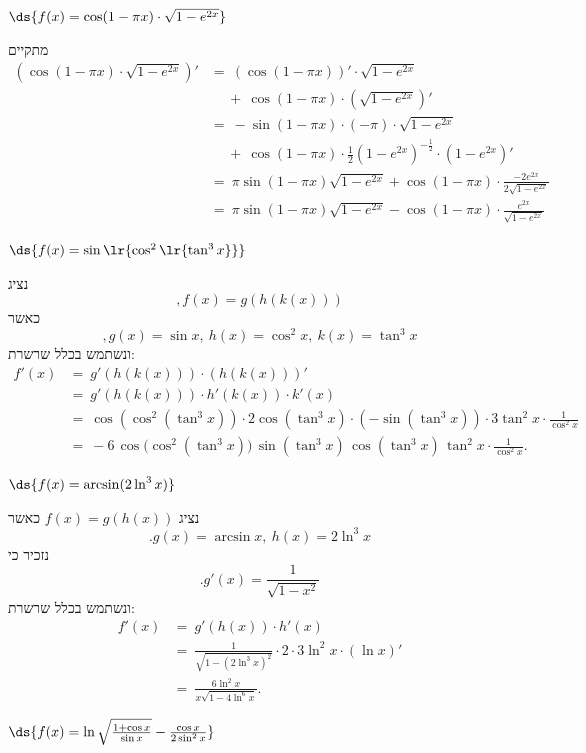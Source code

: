 \item $\ds{f(x) = \cos(1 - \pi x) \cdot \sqrt{1 - e^{2x}}}$
\begin{solbox}
מתקיים
\begin{align*}
    \left(\cos(1 - \pi x) \cdot \sqrt{1 - e^{2x}}\right)'&=\ \left(\cos(1 - \pi x)\right)'\cdot \sqrt{1 - e^{2x}}\\
    &\quad\ +\ \cos(1 - \pi x) \cdot \left(\sqrt{1 - e^{2x}}\right)'\\
    &=\ -\sin(1-\pi x)\cdot(-\pi)\cdot\sqrt{1 - e^{2x}}\\
    &\quad\ +\ \cos(1-\pi x)\cdot\frac{1}{2}(1-e^{2x})^{-\frac{1}{2}}\cdot(1-e^{2x})'\\
    &=\ \pi\sin(1-\pi x)\sqrt{1-e^{2x}}+\cos(1-\pi x)\cdot\frac{-2e^{2x}}{2\sqrt{1-e^{2x}}}\\
    &=\ \pi\sin(1-\pi x)\sqrt{1-e^{2x}}-\cos(1-\pi x)\cdot\frac{e^{2x}}{\sqrt{1-e^{2x}}}
\end{align*}
\end{solbox}
\item $\ds{f(x) = \sin\lr{\cos^2\lr{\tan^3 x}}}$
\begin{solbox}
נציג
$$,f(x)=g(h(k(x)))$$
כאשר
$$,g(x)=\sin x,\ h(x)=\cos^2 x,\ k(x)=\tan^3 x$$
ונשתמש בכלל שרשרת:
\begin{align*}
    f'(x)&=\ g'(h(k(x)))\cdot(h(k(x)))'\\
    &=\ g'(h(k(x)))\cdot h'(k(x))\cdot k'(x)\\
    &=\ \cos(\cos^2(\tan^3 x))\cdot 2\cos(\tan^3x)\cdot(-\sin(\tan^3x))\cdot3\tan^2x\cdot\frac{1}{\cos^2x}\\
    &=\ -6\,\cos\!\big(\cos^2(\tan^3 x)\big)\,\sin(\tan^3 x)\,\cos(\tan^3 x)\,\tan^2 x\cdot \frac{1}{\cos^2 x}.
\end{align*}
\end{solbox}
\item $\ds{f(x) = \arcsin(2 \ln^3 x)}$
\begin{solbox}
נציג
$f(x)=g(h(x))$
כאשר
$$.g(x)=\arcsin x,\ h(x)=2\ln^3x$$
נזכיר כי
$$.g'(x)=\frac{1}{\sqrt{1-x^2}}$$
ונשתמש בכלל שרשרת:
\begin{align*}
    f'(x)&=\ g'(h(x))\cdot h'(x)\\&=\ \frac{1}{\sqrt{1-(2\ln^3x)^2}}\cdot2\cdot3\ln^2x\cdot(\ln x)'\\
    &=\ \frac{6\ln^2 x}{x\sqrt{1-4\ln^6x}}.
\end{align*}
\end{solbox}
\item $\ds{f(x) = \ln\sqrt{\frac{1 + \cos x}{\sin x}} - \frac{\cos x}{2 \sin^2 x}}$
